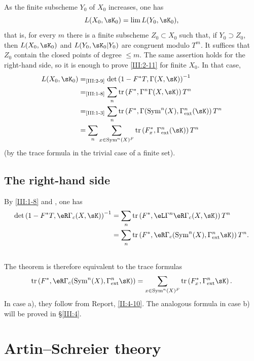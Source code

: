 \documentclass[12pt,oneside,english]{smfbook}
\DeclareMathOperator{\tr}{tr}
\begin{document}
As the finite subscheme $Y_0$ of $X_0$ increases, one has
\[
  L(X_0,\sK_0) = \lim L(Y_0,\sK_0) \text{,}
\]
that is, for every $m$ there is a finite subscheme $Z_0\subset X_0$ such that, if $Y_0\supset Z_0$, then $L(X_0,\sK_0)$ and $L(Y_0,\sK_0|Y_0)$ are congruent modulo $T^m$. It suffices that $Z_0$ contain the closed points of degree $\leqslant m$. The same assertion holds for the right-hand side, so it is enough to prove \ref{III:2-11} for finite $X_0$. In that case,
\begin{align*}
  L(X_0,\sK_0)
    &=_\text{\ref{III:2-9}} \det\left(1-F^* T,\Gamma(X,\sK)\right)^{-1} \\
    &=_\text{\ref{III:1-8}} \sum_n \tr\left(F^*,\Gamma^n \Gamma(X,\sK)\right) T^n \\
    &=_\text{\ref{III:1-3}} \sum_n \tr\left(F^*,\Gamma(\operatorname{Sym}^n(X),\Gamma_\text{ext}^n(\sK)\right) T^n \\
    &= \sum_n \sum_{x\in \operatorname{Sym}^n(X)^F} \tr\left(F_x^*,\Gamma_\text{ext}^n(\sK)\right) T^n
\end{align*}
(by the trace formula in the trivial case of a finite set).

\subsection{The right-hand side}\label{III:2-12}

By \ref{III:1-8} and \cite[XVII 5.5.12]{sga4}, one has
\begin{align*}
  \det\left(1-F^* T,\eR\Gamma_c(X,\sK)\right)^{-1}
    &= \sum_n \tr\left(F^*,\eL\Gamma^n\eR\Gamma_c(X,\sK)\right) T^n \\
    &= \sum_n \tr\left(F^*,\eR\Gamma_c(\operatorname{Sym}^n(X),\Gamma_\text{ext}^n\sK)\right) T^n \text{.}
\end{align*}

\subsection{}\label{III:2-13}

The theorem is therefore equivalent to the trace formulas
\[
  \tr\left(F^*,\eR\Gamma_c(\operatorname{Sym}^n(X),\Gamma_\text{ext}^n \sK)\right)
  = \sum_{x\in\operatorname{Sym}^n(X)^F}
  \tr\left(F_x^*,\Gamma_\text{ext}^n\sK\right) \text{.}
\]
In case a), they follow from Report, \ref{II:4-10}. The analogous formula in case b) will be proved in \S\ref{III:4}.

\section{Artin--Schreier theory}\label{III:3}
\end{document}
